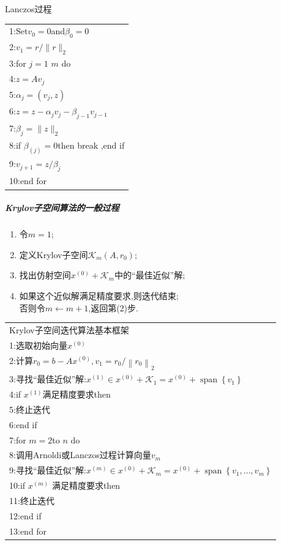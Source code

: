 \documentclass[12pt,a4paper]{article}
\begin{document}
{\color{blue}Lanczos过程}\\
\begin{tabular}{l}
	1:Set$v_0=0$and$\beta_{0}=0$\\
	2:$v_{1}=r /\|r\|_{2}$\\
	3:for $j=1$ \text { to } $m$ do\\
	4:\qquad $z=A v_{j}$\\
	5:\qquad $\alpha_{j}=\left(v_{j}, z\right)$\\
	6:\qquad $z=z-\alpha_{j} v_{j}-\beta_{j-1} v_{j-1}$\\
	7:\qquad $\beta_{j}=\|z\|_{2}$\\
	8:\qquad if $\beta_(j)=0$then break ,end if\\
	9:\qquad $v_{j+1}=z / \beta_j$\\
	10:end for\\
\end{tabular}
\subparagraph*{Krylov子空间算法的一般过程}
\begin{enumerate}[(1)]
	\item 令$m=1$;
	\item 定义Krylov子空间$\mathcal{K}_{m}\left(A, r_{0}\right)$;
	\item 找出{\color{blue}仿射空间$x^{(0)}+\mathcal{K}_{m}$}中的“最佳近似”解;
	\item 如果这个近似解满足精度要求,则迭代结束;\\
	否则令$m \leftarrow m+1$,返回第(2)步.
\end{enumerate}
\begin{tabular}{l}
	{\color{blue}Krylov子空间迭代算法基本框架}\\
	1:选取初始向量$x^{(0)}$\\
	2:计算$r_{0}=b-A x^{(0)}, v_{1}=r_{0} /\left\|r_{0}\right\|_{2}$\\
	3:寻找“最佳近似”解:$x^{(1)} \in x^{(0)}+\mathcal{K}_{1}=x^{(0)}+\operatorname{span}\left\{v_{1}\right\}$\\
	4:if $x^{(1)}$满足精度要求then\\
	5:\qquad 终止迭代\\
	6:end if\\
	7:for $m= 2$to $n$ do\\
	8:\qquad 调用Arnoldi或Lanczos过程计算向量$v_m$\\
	9:\qquad 寻找“最佳近似”解:$x^{(m)} \in x^{(0)}+\mathcal{K}_{m}=x^{(0)}+\operatorname{span}\left\{v_{1}, \ldots, v_{m}\right\}$\\
	10:\qquad if $x^{(m)}$ 满足精度要求then\\
	11:\qquad \qquad 终止迭代\\
	12:\qquad end if\\
	13:end for\\
\end{tabular}
\end{document}
